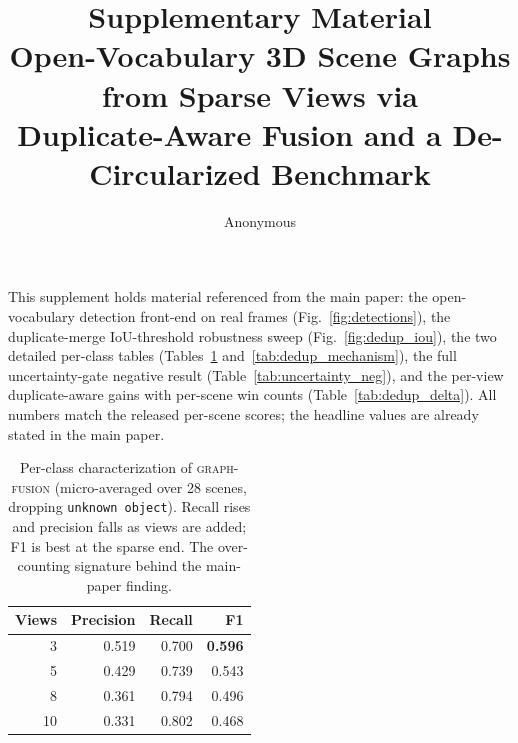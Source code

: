 \documentclass[runningheads]{llncs}
\begin{document}
\title{Supplementary Material\\[2pt]
\large Open-Vocabulary 3D Scene Graphs from Sparse Views via\\Duplicate-Aware Fusion and a De-Circularized Benchmark}
\author{Anonymous}
\maketitle

This supplement holds material referenced from the main paper: the open-vocabulary detection front-end
on real frames (Fig.~\ref{fig:detections}), the duplicate-merge IoU-threshold robustness sweep
(Fig.~\ref{fig:dedup_iou}), the two detailed per-class tables (Tables~\ref{tab:perclass_overall}
and~\ref{tab:dedup_mechanism}), the full uncertainty-gate negative result
(Table~\ref{tab:uncertainty_neg}), and the per-view duplicate-aware gains with per-scene win counts
(Table~\ref{tab:dedup_delta}). All numbers match the released per-scene scores; the headline values are
already stated in the main paper.





\begin{table}[t]
\centering
\caption{Per-class characterization of \textsc{graph-fusion} (micro-averaged over 28 scenes, dropping
\texttt{unknown object}). Recall rises and precision falls as views are added; F1 is best at the sparse
end. The over-counting signature behind the main-paper finding.}
\label{tab:perclass_overall}
\small
\begin{tabular}{rrrr}
\toprule
Views & Precision & Recall & F1 \\
\midrule
3  & 0.519 & 0.700 & \textbf{0.596} \\
5  & 0.429 & 0.739 & 0.543 \\
8  & 0.361 & 0.794 & 0.496 \\
10 & 0.331 & 0.802 & 0.468 \\
\bottomrule
\end{tabular}
\end{table}
\end{document}
